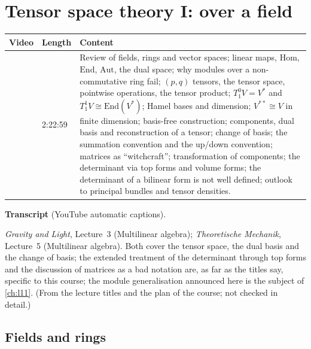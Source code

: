 \chapter{Tensor space theory I: over a field}\label{ch:l08}
\begin{paracol}{2}

\begin{sources}
\begin{tabularx}{\linewidth}{@{}l l L@{}}
\toprule
\textbf{Video} & \textbf{Length} & \textbf{Content}\\
\midrule
{} & 2:22:59 & Review of fields, rings and vector spaces; linear maps, $\mathrm{Hom}$, $\mathrm{End}$, $\mathrm{Aut}$, the dual space; why modules over a non-commutative ring fail; $(p,q)$ tensors, the tensor space, pointwise operations,
the tensor product; $T^0_1V=V^*$ and $T^1_1V\cong\mathrm{End}(V^*)$; Hamel bases and dimension; $V^{**}\cong V$ in finite dimension; basis-free construction; components, dual basis and reconstruction of a tensor; change of basis; the
summation convention and the up/down convention; matrices as ``witchcraft''; transformation of components; the determinant via top forms and volume forms; the determinant of a bilinear form is not well defined; outlook to
principal bundles and tensor densities.\\
\bottomrule
\end{tabularx}

\smallskip
\textbf{Transcript}  (YouTube automatic captions).
\end{sources}

\begin{reading}
\emph{Gravity and Light}, Lecture~3 (Multilinear algebra); \emph{Theoretische Mechanik}, Lecture~5 (Multilinear algebra). Both cover the tensor space, the dual basis and the change of basis; the extended
treatment of the determinant through top forms and the discussion of matrices as a bad notation are, as far as the titles say, specific to this course; the module generalisation announced here is the subject of \cref{ch:l11}.
(From the lecture titles and the plan of the course; not checked in detail.)
\end{reading}

\section{Fields and rings}\label{sec:te-field}


\end{paracol}
